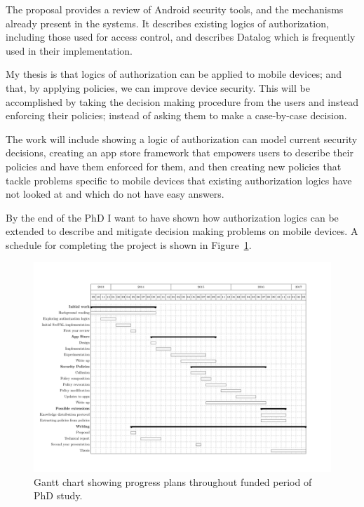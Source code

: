 \documentclass[a4paper]{article}
\begin{document}
The proposal provides a review of Android security tools, and the mechanisms
already present in the systems.  It describes existing logics of authorization,
including those used for access control, and describes Datalog which is
frequently used in their implementation. 

My thesis is that logics of authorization can be applied to mobile devices; and
that, by applying policies, we can improve device security.  This will be
accomplished by taking the decision making procedure from the users and instead
enforcing their policies; instead of asking them to make a case-by-case
decision.

The work will include showing a logic of authorization can model current
security decisions, creating an app store framework that empowers users to
describe their policies and have them enforced for them, and then creating new
policies that tackle problems specific to mobile devices that existing
authorization logics have not looked at and which do not have easy answers.

By the end of the PhD I want to have shown how authorization logics can be
extended to describe and mitigate decision making problems on mobile devices.
A schedule for completing the project is shown in Figure~\ref{fig:gantt}.

\vfill
\begin{figure}
  \includegraphics[width=1.3\linewidth,angle=90]{gantt.pdf}
  \caption{Gantt chart showing progress plans throughout funded period of PhD
  study.}\label{fig:gantt}
\end{figure}
\pagebreak


\appendix

\end{document}
